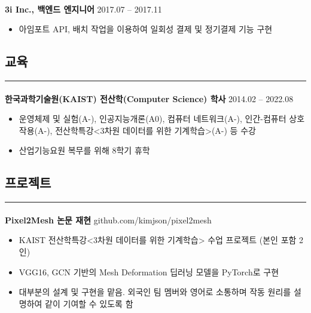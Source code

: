 \documentclass{article}
\begin{document}
\paragraph{}
\textbf{3i Inc., 백엔드 엔지니어} \hfill 2017.07 -- 2017.11
\begin{itemize}
    \setlength\itemsep{0.1em}
     \item 아임포트 API, 배치 작업을 이용하여 일회성 결제 및 정기결제 기능 구현
\end{itemize}

\begin{center}
    \section*{교육}
\end{center}
\hrule
\paragraph{\newline \newline}
\textbf{한국과학기술원(KAIST) 전산학(Computer Science) 학사} \hfill 2014.02 -- 2022.08
\begin{itemize}
    \setlength\itemsep{0.1em}
    \item 운영체제 및 실험(A-), 인공지능개론(A0), 컴퓨터 네트워크(A-), 인간-컴퓨터 상호작용(A-), 전산학특강<3차원 데이터를 위한 기계학습>(A-) 등 수강
    \item 산업기능요원 복무를 위해 8학기 휴학
\end{itemize}

\begin{center}
    \section*{프로젝트}
\end{center}
\hrule
\paragraph{\newline \newline}
\textbf{Pixel2Mesh 논문 재현} \hfill github.com/kimjson/pixel2mesh
\begin{itemize}
    \setlength\itemsep{0.1em}
    \item KAIST 전산학특강<3차원 데이터를 위한 기계학습> 수업 프로젝트 (본인 포함 2인)
    \item VGG16, GCN 기반의 Mesh Deformation 딥러닝 모델을 PyTorch로 구현
    \item 대부분의 설계 및 구현을 맡음. 외국인 팀 멤버와 영어로 소통하며 작동 원리를 설명하여 같이 기여할 수 있도록 함
\end{itemize}
\end{document}
